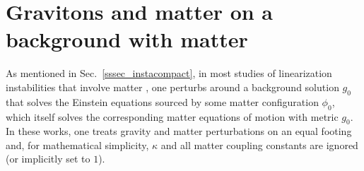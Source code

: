 \documentclass[]{jkpaper}
\theoremstyle{plain}
\theoremstyle{definition}
\begin{document}
\section{Gravitons and matter on a background with matter}\label{sec_matter}



As mentioned in Sec.~\ref{sssec_instacompact}, in most studies of linearization instabilities that involve matter \cite{Arms1,Arms:1979au,Arms:1982ea,Saraykar:1981qm,Saraykar2,Arms:1986vk,Altas:2021htf}, one perturbs around a background solution $g_0$ that solves the Einstein equations sourced by some matter configuration $\phi_0$, which itself solves the corresponding matter equations of motion with metric $g_0$. In these works, one treats gravity and matter perturbations on an equal footing and, for mathematical simplicity, $\kappa$ and all matter coupling constants are ignored (or implicitly set to $1$). 
\end{document}
